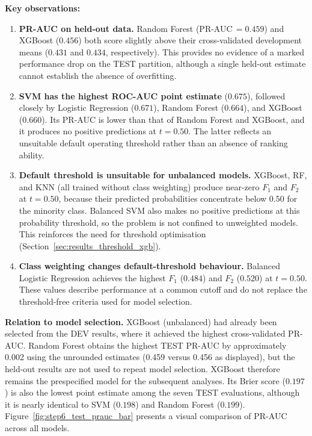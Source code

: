 \noindent\textbf{Key observations:}
\begin{enumerate}
  \item \textbf{PR-AUC on held-out data.}
    Random Forest (PR-AUC\,$=\!0.459$) and XGBoost ($0.456$) both score slightly above their cross-validated development means ($0.431$ and $0.434$, respectively). This provides no evidence of a marked performance drop on the TEST partition, although a single held-out estimate cannot establish the absence of overfitting.
  \item \textbf{SVM has the highest ROC-AUC point estimate} ($0.675$), followed closely by Logistic Regression ($0.671$), Random Forest ($0.664$), and XGBoost ($0.660$).
    Its PR-AUC is lower than that of Random Forest and XGBoost, and it produces no positive predictions at $t\!=\!0.50$. The latter reflects an unsuitable default operating threshold rather than an absence of ranking ability.
  \item \textbf{Default threshold is unsuitable for unbalanced models.}
    XGBoost, RF, and KNN (all trained without class weighting) produce near-zero $F_1$ and $F_2$ at $t\!=\!0.50$, because their predicted probabilities concentrate below $0.50$ for the minority class. Balanced SVM also makes no positive predictions at this probability threshold, so the problem is not confined to unweighted models.
    This reinforces the need for threshold optimisation (Section~\ref{sec:results_threshold_xgb}).
  \item \textbf{Class weighting changes default-threshold behaviour.}
    Balanced Logistic Regression achieves the highest $F_1$ ($0.484$) and $F_2$ ($0.520$) at $t\!=\!0.50$. These values describe performance at a common cutoff and do not replace the threshold-free criteria used for model selection.
\end{enumerate}

\noindent\textbf{Relation to model selection.}
XGBoost (unbalanced) had already been selected from the \gls{DEV} results, where it achieved the highest cross-validated PR-AUC. Random Forest obtains the highest TEST PR-AUC by approximately 0.002 using the unrounded estimates (0.459 versus 0.456 as displayed), but the held-out results are not used to repeat model selection. XGBoost therefore remains the prespecified model for the subsequent analyses. Its Brier score ($0.197$) is also the lowest point estimate among the seven TEST evaluations, although it is nearly identical to SVM ($0.198$) and Random Forest ($0.199$).
Figure~\ref{fig:step6_test_prauc_bar} presents a visual comparison of PR-AUC across all models.

